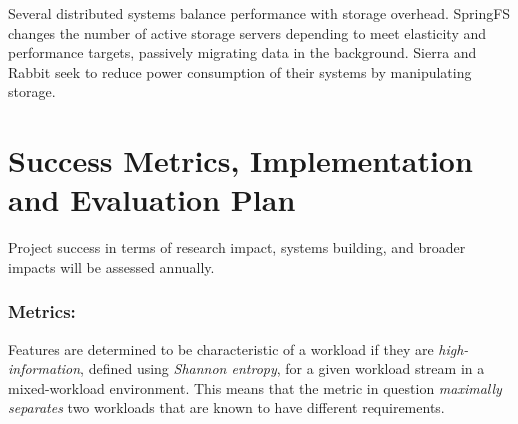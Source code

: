 Several distributed systems balance performance with storage overhead.
SpringFS \cite{xu2014springfs} changes the number of active storage servers
depending to meet elasticity and performance targets, passively migrating
data in the background.
Sierra \cite{sierra} and Rabbit \cite{amur2010robust} seek to reduce power consumption
of their systems by manipulating storage. %

\section{Success Metrics, Implementation and Evaluation Plan}%

Project success in terms of research impact,
systems building, and broader impacts will be assessed annually. 

\subsubsection*{Metrics: }

Features are determined to be characteristic of a workload if they are
\emph{high-information}, defined using \emph{Shannon entropy}, for a given workload stream in a mixed-workload environment.  This
means that the metric in question \emph{maximally separates} two workloads that are
known to have different requirements.






